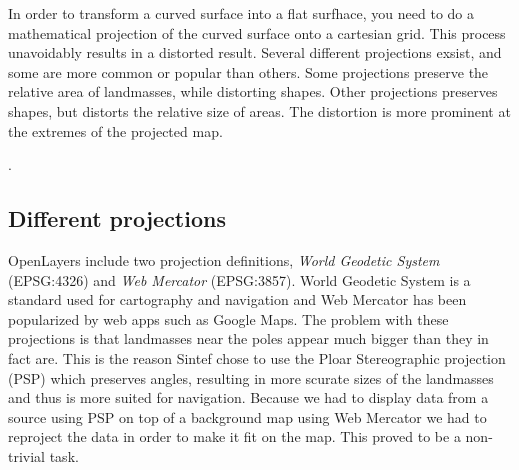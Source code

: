\documentclass[11pt,a4paper,titlepage,oneside]{report}
\begin{document}
In order to transform a curved surface into a flat surfhace, you need to do a mathematical projection of the curved surface onto a cartesian grid.
This process unavoidably results in a distorted result. Several different projections exsist, and some are more common or popular than others.
Some projections preserve the relative area of landmasses, while distorting shapes. Other projections preserves shapes, but distorts the relative size of areas. The distortion is more prominent at the extremes of the projected map.

\cite{mapProjections}.

\subsection{Different projections}
OpenLayers include two projection definitions, \textit{World Geodetic System} (EPSG:4326) and \textit{Web Mercator} (EPSG:3857). World Geodetic System is a standard used for cartography and navigation and Web Mercator has been popularized by web apps such as Google Maps. The problem with these projections is that landmasses near the poles appear much bigger than they in fact are.
This is the reason Sintef chose to use the Ploar Stereographic projection (PSP) which preserves angles, resulting in more scurate sizes of the landmasses and thus is more suited for navigation.
Because we had to display data from a source using PSP on top of a background map using Web Mercator we had to reproject the data in order to make it fit on the map. This proved to be a non-trivial task.
\end{document}
